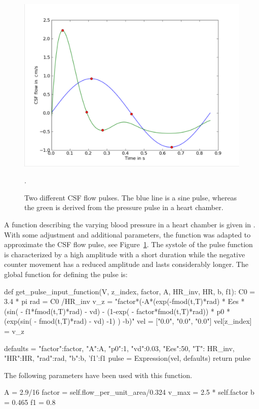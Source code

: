 \begin{figure}\begin{center}
\includegraphics[width=\largefig]{chapters/hentschel/pdf/sin_pulse.pdf}
\caption{Two different CSF flow pulses. The blue line is a sine pulse,
    whereas the green is derived from the pressure pulse in a heart chamber.}
\label{fig:sin_pulse}.
\end{center}\end{figure}

A function describing the varying blood pressure in a heart chamber is
given in \citet{SmithChase2ShawEtAl2006}.  With some adjustment and
additional parameters, the function was adapted to approximate the CSF
flow pulse, see Figure~\ref{fig:sin_pulse}.  The systole of the pulse
function is characterized by a high amplitude with a short duration
while the negative counter movement has a reduced amplitude and lasts
considerably longer.  The global function for defining the pulse is:
\begin{python}
def get_pulse_input_function(V, z_index, factor, A, HR_inv, HR, b, f1):
        C0 = 3.4 * pi
        rad = C0 /HR_inv    
        v_z = "factor*(-A*(exp(-fmod(t,T)*rad) * Ees * (sin( - f1*fmod(t,T)*rad) - vd) 
              - (1-exp( - factor*fmod(t,T)*rad)) * p0 * (exp(sin( - fmod(t,T)*rad) - vd) -1) ) -b)"
        vel = ["0.0", "0.0", "0.0"]
        vel[z_index] = v_z

        defaults = {"factor":factor, "A":A, "p0":1, "vd":0.03, "Ees":50, 
                    "T": HR_inv, "HR":HR, "rad":rad, "b":b, 'f1':f1}
        pulse = Expression(vel, defaults)
        return pulse 
\end{python}
The following parameters have been used with this function.
\begin{python}
A = 2.9/16	
factor = self.flow_per_unit_area/0.324
v_max = 2.5 * self.factor
b = 0.465 	
f1 = 0.8
\end{python}

